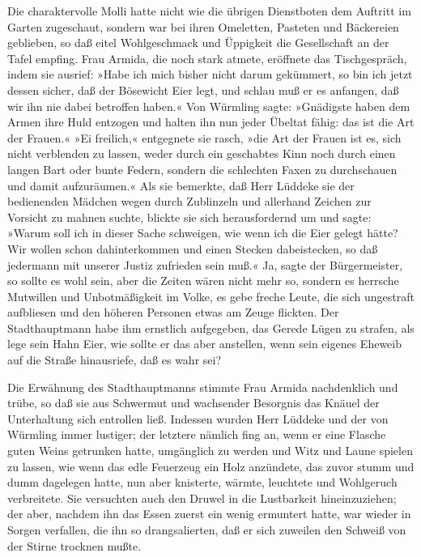 Die charaktervolle Molli hatte nicht wie die übrigen Dienstboten
dem Auftritt im Garten zugeschaut, sondern war bei ihren Omeletten,
Pasteten und Bäckereien geblieben, so daß eitel Wohlgeschmack und
Üppigkeit die Gesellschaft an der Tafel empfing. Frau Armida, die
noch stark atmete, eröffnete das Tischgespräch, indem sie ausrief:
»Habe ich mich bisher nicht darum gekümmert, so bin ich jetzt
dessen sicher, daß der Bösewicht Eier legt, und schlau muß er es
anfangen, daß wir ihn nie dabei betroffen haben.« Von Würmling
sagte: »Gnädigste haben dem Armen ihre Huld entzogen und halten ihn
nun jeder Übeltat fähig: das ist die Art der Frauen.« »Ei
freilich,« entgegnete sie rasch, »die Art der Frauen ist es, sich
nicht verblenden zu lassen, weder durch ein geschabtes Kinn noch
durch einen langen Bart oder bunte Federn, sondern die schlechten
Faxen zu durchschauen und damit aufzuräumen.« Als sie bemerkte, daß
Herr Lüddeke sie der bedienenden Mädchen wegen durch Zublinzeln und
allerhand Zeichen zur Vorsicht zu mahnen suchte, blickte sie sich
herausfordernd um und sagte: »Warum soll ich in dieser Sache
schweigen, wie wenn ich die Eier gelegt hätte? Wir wollen schon
dahinterkommen und einen Stecken dabeistecken, so daß jedermann mit
unserer Justiz zufrieden sein muß.« Ja, sagte der Bürgermeister, so
sollte es wohl sein, aber die Zeiten wären nicht mehr so, sondern
es herrsche Mutwillen und Unbotmäßigkeit im Volke, es gebe freche
Leute, die sich ungestraft aufbliesen und den höheren Personen
etwas am Zeuge flickten. Der Stadthauptmann habe ihm ernstlich
aufgegeben, das Gerede Lügen \pagenum{[20]} zu strafen, als lege
sein Hahn Eier, wie sollte er das aber anstellen, wenn sein eigenes
Eheweib auf die Straße hinausriefe, daß es wahr sei?

Die Erwähnung des Stadthauptmanns stimmte Frau Armida nachdenklich
und trübe, so daß sie aus Schwermut und wachsender Besorgnis das
Knäuel der Unterhaltung sich entrollen ließ. Indessen wurden Herr
Lüddeke und der von Würmling immer lustiger; der letztere nämlich
fing an, wenn er eine Flasche guten Weins getrunken hatte,
umgänglich zu werden und Witz und Laune spielen zu lassen, wie wenn
das edle Feuerzeug ein Holz anzündete, das zuvor stumm und dumm
dagelegen hatte, nun aber knisterte, wärmte, leuchtete und
Wohlgeruch verbreitete. Sie versuchten auch den Druwel in die
Lustbarkeit hineinzuziehen; der aber, nachdem ihn das Essen zuerst
ein wenig ermuntert hatte, war wieder in Sorgen verfallen, die ihn
so drangsalierten, daß er sich zuweilen den Schweiß von der Stirne
trocknen mußte.

